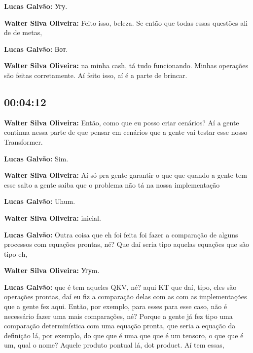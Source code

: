 \textbf{Lucas Galvão:} Угу.



\textbf{Walter Silva Oliveira:} Feito isso, beleza. Se então que todas essas questões ali de de metas,



\textbf{Lucas Galvão:} Вот.



\textbf{Walter Silva Oliveira:} na minha cash, tá tudo funcionando. Minhas operações são feitas corretamente. Aí feito isso, aí é a parte de brincar.



\subsection{\textbf{00:04:12}}



\textbf{Walter Silva Oliveira:} Então, como que eu posso criar cenários? Aí a gente continua nessa parte de que pensar em cenários que a gente vai testar esse nosso Transformer.



\textbf{Lucas Galvão:} Sim.



\textbf{Walter Silva Oliveira:} Aí só pra gente garantir o que que quando a gente tem esse salto a gente saiba que o problema não tá na nossa implementação



\textbf{Lucas Galvão:} Uhum.



\textbf{Walter Silva Oliveira:} inicial.



\textbf{Lucas Galvão:} Outra coisa que eh foi feita foi fazer a comparação de alguns processos com equações prontas, né? Que daí seria tipo aquelas equações que são tipo eh,



\textbf{Walter Silva Oliveira:} Угуm.



\textbf{Lucas Galvão:} que é tem aqueles QKV, né? aqui KT que daí, tipo, eles são operações prontas, daí eu fiz a comparação delas com as com as implementações que a gente fez aqui. Então, por exemplo, para esses para esse caso, não é necessário fazer uma mais comparações, né? Porque a gente já fez tipo uma comparação determinística com uma equação pronta, que seria a equação da definição lá, por exemplo, do que que é uma que que é um tensoro, o que que é um, qual o nome? Aquele produto pontual lá, dot product. Aí tem essas,



